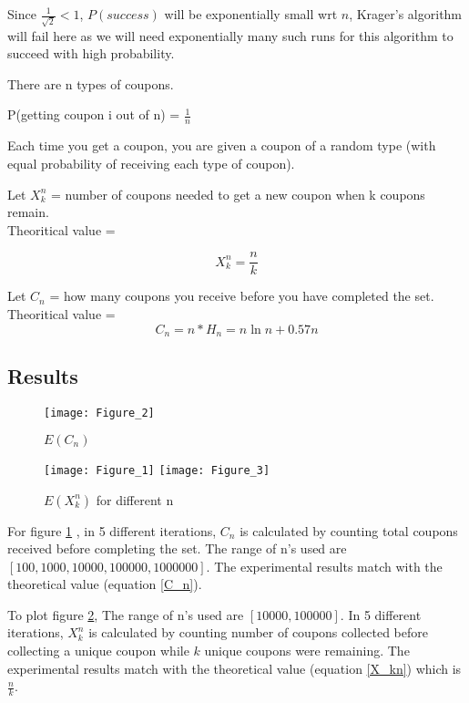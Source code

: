 \documentclass{homeworg}
\let\Oldsubsection\subsection
\renewcommand{\subsection}{\FloatBarrier\Oldsubsection}
\begin{document}
Since $\frac{1}{\surd{2}} < 1$, $P(success)$ will be exponentially small wrt $n$, Krager's algorithm will fail here as we will need exponentially many such runs for this algorithm to succeed with high probability.

\newpage



\exercise
There are n types of coupons.

P(getting coupon i out of n) = $\frac{1}{n}$

Each time you get a coupon, you are given a coupon of a random type (with equal probability of receiving each type of coupon).

Let $X_k^n$ = number of coupons needed to get a new coupon when k coupons remain. \\
Theoritical value = 

\begin{equation}
\label{X_kn}
X_k^n = \frac{n}{k}
\end{equation}

Let $C_n$ = how many coupons you receive before you have completed the set. \\ 
Theoritical value = 
\begin{equation}
\label{C_n}
C_n = n \ast H_n = n \ln n +0.57n    
\end{equation}

\subsection{Results}

\begin{figure}[h]
    \centering
    \texttt{[image: Figure\_2]}
    \caption{$E(C_n)$}
    \label{fig:C_n}
\end{figure}

\begin{figure}[h]
    \centering
    \texttt{[image: Figure\_1]}
    \texttt{[image: Figure\_3]}
    \caption{$E(X_k^n)$ for different n}
    \label{fig:X_kn}
\end{figure}



For figure \ref{fig:C_n} , in 5 different iterations, $C_n$ is calculated by counting total coupons received before completing the set. The range of n's used are $[100, 1000, 10000, 100000, 1000000]$. The experimental results match with the theoretical value (equation \ref{C_n}).

To plot figure \ref{fig:X_kn}, The range of n's used are $[ 10000, 100000]$. In 5 different iterations, $X_k^n$ is calculated by counting number of coupons collected before collecting a unique coupon while $k$ unique coupons were remaining. The experimental results match with the theoretical value (equation \ref{X_kn}) which is $\frac{n}{k}$.\\
\end{document}
